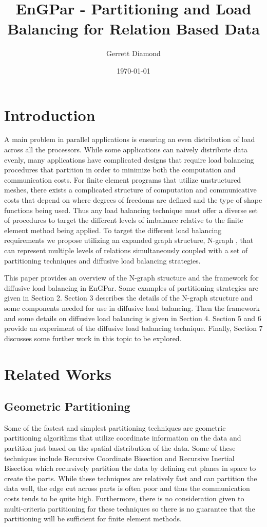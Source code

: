 \documentclass[a4paper]{article}
\title{EnGPar - Partitioning and Load Balancing for Relation Based Data}
\author{Gerrett Diamond}
\date{\today}
\begin{document}
\maketitle

\section{Introduction}
A main problem in parallel applications is ensuring an even distribution of load across all the processors. While some applications can naively distribute data evenly, many applications have complicated designs that require load balancing procedures that partition in order to minimize both the computation and communication costs. For finite element programs that utilize unstructured meshes, there exists a complicated structure of computation and communicative costs that depend on where degrees of freedoms are defined and the type of shape functions being used. Thus any load balancing technique must offer a diverse set of procedures to target the different levels of imbalance relative to the finite element method being applied. To target the different load balancing requirements we propose utilizing an expanded graph structure, N-graph \cite{EnGPar2015proposal}, that can represent multiple levels of relations simultaneously coupled with a set of partitioning techniques and diffusive load balancing strategies.

This paper provides an overview of the N-graph structure and the framework for diffusive load balancing in EnGPar. Some examples of partitioning strategies are given in Section 2. Section 3 describes the details of the N-graph structure and some components needed for use in diffusive load balancing. Then the framework and some details on diffusive load balancing is given in Section 4. Section 5 and 6 provide an experiment of the diffusive load balancing technique. Finally, Section 7 discusses some further work in this topic to be explored.

\section{Related Works}
\subsection{Geometric Partitioning}
Some of the fastest and simplest partitioning techniques are geometric partitioning algorithms that utilize coordinate information on the data and partition just based on the spatial distribution of the data. Some of these techniques include Recursive Coordinate Bisection and Recursive Inertial Bisection \cite{chevalier2012load,TaylorRIB,williamsRIB} which recursively partition the data by defining cut planes in space to create the parts. While these techniques are relatively fast and can partition the data well, the edge cut across parts is often poor and thus the communication costs tends to be quite high. Furthermore, there is no consideration given to multi-criteria partitioning for these techniques so there is no guarantee that the partitioning will be sufficient for finite element methods.
\end{document}
